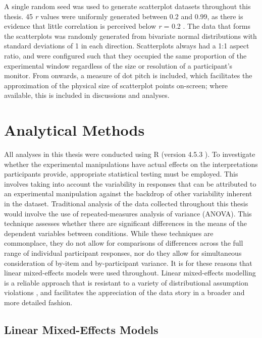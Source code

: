 \documentclass[../main.tex]{subfiles}
\begin{document}
A single random seed was used to generate scatterplot datasets
throughout this thesis. 45 \emph{r} values were uniformly generated
between 0.2 and 0.99, as there is evidence that little correlation is
perceived below \emph{r} = 0.2
\cite{strahan_1978, bobko_1979, cleveland_1982}. The data that forms the
scatterplots was randomly generated from bivariate normal distributions
with standard deviations of 1 in each direction. Scatterplots always had
a 1:1 aspect ratio, and were configured such that they occupied the same
proportion of the experimental window regardless of the size or
resolution of a participant's monitor. From 
onwards, a measure of dot pitch is included, which facilitates the
approximation of the physical size of scatterplot points on-screen;
where available, this is included in discussions and analyses.

\section{Analytical Methods}\label{analytical-methods}

All analyses in this thesis were conducted using R (version 4.5.3
\cite{r_core}). To investigate whether the experimental manipulations
have actual effects on the interpretations participants provide,
appropriate statistical testing must be employed. This involves taking
into account the variability in responses that can be attributed to an
experimental manipulation against the backdrop of other variability
inherent in the dataset. Traditional analysis of the data collected
throughout this thesis would involve the use of repeated-measures
analysis of variance (ANOVA). This technique assesses whether there are
significant differences in the means of the dependent variables between
conditions. While these techniques are commonplace, they do not allow
for comparisons of differences across the full range of individual
participant responses, nor do they allow for simultaneous consideration
of by-item and by-participant variance. It is for these reasons that
linear mixed-effects models were used throughout. Linear mixed-effects
modelling is a reliable approach that is resistant to a variety of
distributional assumption violations \cite{schielzeth_2020}, and
facilitates the appreciation of the data story in a broader and more
detailed fashion.

\subsection{Linear Mixed-Effects
Models}\label{linear-mixed-effects-models}
\end{document}
